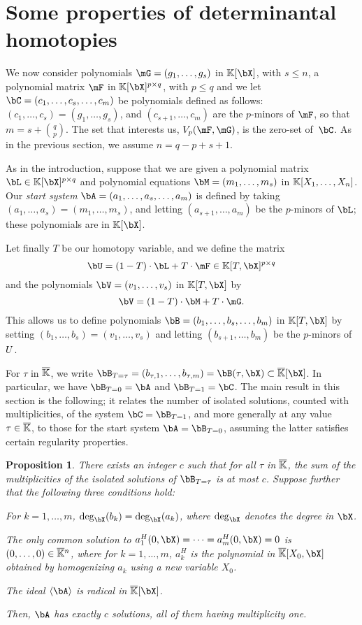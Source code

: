 \documentclass[12pt]{article}
\newtheorem{proposition}[definition]{Proposition}
\begin{document}
\section{Some properties of determinantal homotopies}\label{sec:homotopy}

We now consider polynomials $\mG=(g_1,\dots,g_s)$ in $\KK[\bX]$, with
$s \le n$, a polynomial matrix $\mF$ in $\KK[\bX]^{p \times q}$, with
$p \le q$ and we let $\bC=(c_1,\dots,c_{s},\dots,c_m)$ be polynomials
defined as follows: $(c_1,\dots,c_{s})=(g_1,\dots,g_s)$, and
$(c_{s+1},\dots,c_{m})$ are the $p$-minors of $\mF$, so that $m=s+{q
  \choose p}$. The set that interests us, $\VpFG{p}{\mF}{\mG}$, is the
zero-set of~$\bC$. As in the previous section, we assume $n=q-p+s+1$.

As in the introduction, suppose that we are given a polynomial matrix
$\bL \in \K[\bX]^{p \times q}$ and polynomial equations
$\bM=(m_1,\dots,m_s)$ in $\mathbb{K}[X_1,\dots,X_n]$. Our {\em start system}
$\bA=(a_1,\dots,a_s,\dots,a_m)$ is defined by taking $(a_1,\dots,a_s) =
(m_1,\dots,m_s)$, and letting $(a_{s+1},\dots,a_m)$ be the $p$-minors
of $\bL$; these polynomials are in $\KK[\bX]$. 

Let finally $T$ be our homotopy variable, and we define the matrix
\[\bU = (1-T)\cdot \bL + T \cdot \mF \in \KK[T, \bX]^{p \times q}\]
and the polynomials $\bV=(v_1,\dots,v_s)$ in $\K[T,\bX]$ by
\[\bV = (1-T) \cdot \bM + T \cdot \mG.\]
This allows us to define polynomials $\bB=(b_1,\dots,b_s,\dots,b_m)$
in $\KK[T,\bX]$ by setting $(b_1,\dots,b_s)=(v_1,\dots,v_s)$
and letting $(b_{s+1},\dots,b_m)$ be the $p$-minors of ${U}$.

For $\tau$ in $\overline{\mathbb{K}}$, we write
$\bB_{T=\tau}=(b_{\tau,1},\dots,b_{\tau,m})=\bB(\tau,\bX)\subset
\KKbar[\bX]$. In particular, we have $\bB_{T=0}=\bA$ and
$\bB_{T=1}=\bC$.  The main result in this section is the following; it
relates the number of isolated solutions, counted with multiplicities,
of the system $\bC=\bB_{T=1}$, and more generally at any value $\tau
\in \overline{\mathbb{K}}$, to those for the start system $\bA=\bB_{T=0}$, assuming the latter
satisfies certain regularity properties.
\begin{proposition}\label{prop:degree_fiber}
  There exists an integer $c$ such that for all $\tau$ in $\overline{\mathbb{K}}$, the
  sum of the multiplicities of the isolated solutions of $\bB_{T=\tau}$
  is at most $c$. Suppose further that the following three conditions
  hold:
\begin{description}[leftmargin=*]
\item[$\assG_1.$] For $k=1,\dots,m$, $\deg_\bX(b_k)=\deg_\bX(a_k)$,
  where $\deg_\bX$ denotes the degree in $\bX$.
\item[$\assG_2.$] The only common solution to
  $a_1^H(0,\bX)=\cdots=a_m^H(0,\bX)=0$ is $(0,\dots,0)\in\overline{\mathbb{K}}{}^n$,
  where for $k=1,\dots,m$, $a_{k}^H$ is the polynomial in
  $\KKbar[X_0,\bX]$ obtained by homogenizing $a_{k}$ using a new
  variable $X_0$.
\item[$\assG_3.$] The ideal $\langle \bA \rangle$ is radical in $\KKbar[\bX]$.
\end{description}
Then, $\bA$ has exactly $c$ solutions, all of them having multiplicity
one.
\end{proposition}
\end{document}
